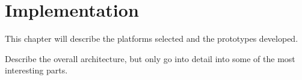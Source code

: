 \chapter{Implementation}
This chapter will describe the platforms selected and the prototypes developed.


Describe the overall architecture, but only go into detail into some of the most interesting parts.